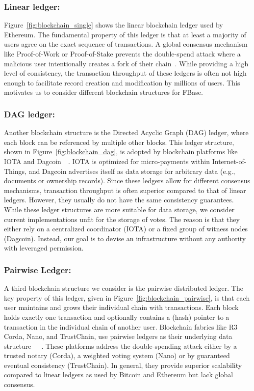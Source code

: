 \subsubsection{\textbf{Linear ledger:}} 
Figure~\ref{fig:blockchain_single} shows the linear blockchain ledger used by Ethereum.
The fundamental property of this ledger is that at least a majority of users agree on the exact sequence of transactions.
A global consensus mechanism like Proof-of-Work or Proof-of-Stake prevents the double-spend attack where a malicious user intentionally creates a fork of their chain~\cite{vukolic2015quest}.
While providing a high level of consistency, the transaction throughput of these ledgers is often not high enough to facilitate record creation and modification by millions of users.
This motivates us to consider different blockchain structures for FBase.

\subsubsection{\textbf{DAG ledger:}} 
Another blockchain structure is the Directed Acyclic Graph (DAG) ledger, where each block can be referenced by multiple other blocks.
This ledger structure, shown in Figure~\ref{fig:blockchain_dag}, is adopted by blockchain platforms like IOTA and Dagcoin~\cite{popov2018tangle}~\cite{lerner2015dagcoin}.
IOTA is optimized for micro-payments within Internet-of-Things, and Dagcoin advertises itself as data storage for arbitrary data (e.g., documents or ownership records).
Since these ledgers allow for different consensus mechanisms, transaction throughput is often superior compared to that of linear ledgers.
However, they usually do not have the same consistency guarantees.
While these ledger structures are more suitable for data storage, we consider current implementations unfit for the storage of votes.
The reason is that they either rely on a centralized coordinator (IOTA) or a fixed group of witness nodes (Dagcoin).
Instead, our goal is to devise an infrastructure without any authority with leveraged permission.

\subsubsection{\textbf{Pairwise Ledger:}}
A third blockchain structure we consider is the pairwise distributed ledger.
The key property of this ledger, given in Figure~\ref{fig:blockchain_pairwise}, is that each user maintains and grows their individual chain with transactions.
Each block holds exactly one transaction and optionally contains a (hash) pointer to a transaction in the individual chain of another user.
Blockchain fabrics like R3 Corda, Nano, and TrustChain, use pairwise ledgers as their underlying data structure~\cite{otte2017trustchain}~\cite{lemahieu2017raiblocks}~\cite{brown2017introducing}.
These platforms address the double-spending attack either by a trusted notary (Corda), a weighted voting system (Nano) or by guaranteed eventual consistency (TrustChain).
In general, they provide superior scalability compared to linear ledgers as used by Bitcoin and Ethereum but lack global consensus.

